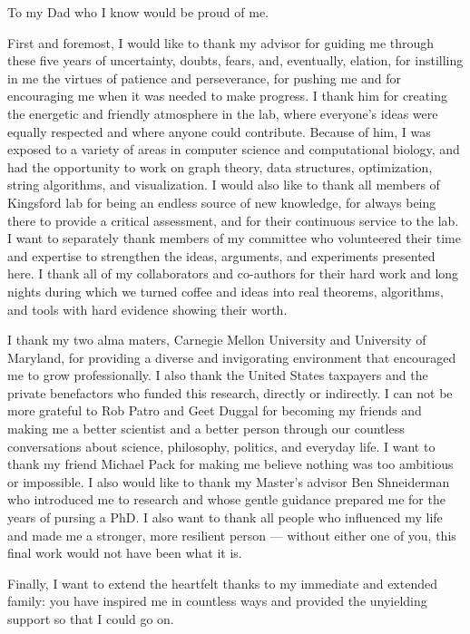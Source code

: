 \documentclass[12pt]{cmuthesis}
\begin{document}
\begin{dedication}
To my Dad who I know would be proud of me.
\end{dedication}


\begin{acknowledgments}
First and foremost, I would like to thank my advisor for guiding me through these five years of uncertainty, doubts, fears, and, eventually, elation, for instilling in me the virtues of patience and perseverance, for pushing me and for encouraging me when it was needed to make progress. I thank him for creating the energetic and friendly atmosphere in the lab, where everyone's ideas were equally respected and where anyone could contribute. Because of him, I was exposed to a variety of areas in computer science and computational biology, and had the opportunity to work on graph theory, data structures, optimization, string algorithms, and visualization. I would also like to thank all members of Kingsford lab for being an endless source of new knowledge, for always being there to provide a critical assessment, and for their continuous service to the lab. I want to separately thank members of my committee who volunteered their time and expertise to strengthen the ideas, arguments, and experiments presented here. I thank all of my collaborators and co-authors for their hard work and long nights during which we turned coffee and ideas into real theorems, algorithms, and tools with hard evidence showing their worth.

I thank my two alma maters, Carnegie Mellon University and University of Maryland, for providing a diverse and invigorating environment that encouraged me to grow professionally. I also thank the United States taxpayers and the private benefactors who funded this research, directly or indirectly. I can not be more grateful to Rob Patro and Geet Duggal for becoming my friends and making me a better scientist and a better person through our countless conversations about science, philosophy, politics, and everyday life. I want to thank my friend Michael Pack for making me believe nothing was too ambitious or impossible. I also would like to thank my Master's advisor Ben Shneiderman who introduced me to research and whose gentle guidance prepared me for the years of pursing a PhD. I also want to thank all people who influenced my life and made me a stronger, more resilient person --- without either one of you, this final work would not have been what it is.

Finally, I want to extend the heartfelt thanks to my immediate and extended family: you have  inspired me in countless ways and provided the unyielding support so that I could go on.
\end{acknowledgments}
\end{document}
